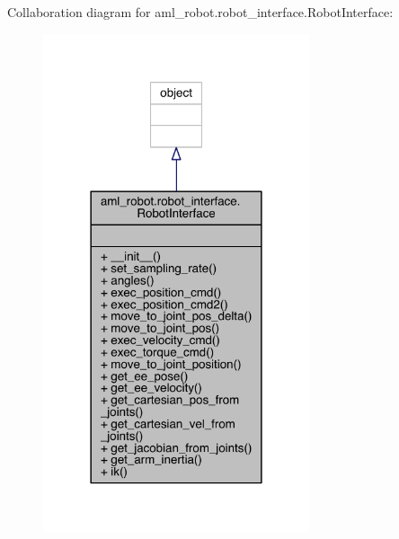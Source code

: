 Collaboration diagram for aml\+\_\+robot.\+robot\+\_\+interface.\+Robot\+Interface\+:
\nopagebreak
\begin{figure}[H]
\begin{center}
\leavevmode
\includegraphics[width=222pt]{classaml__robot_1_1robot__interface_1_1_robot_interface__coll__graph}
\end{center}
\end{figure}
